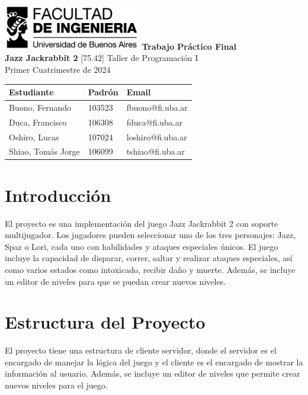 \documentclass[titlepage,a4paper]{article}
\begin{document}
\begin{titlepage} %
	\hfill\includegraphics[width=6cm]{logofiuba.jpg}
    \centering
    \vfill
    \Huge \textbf{Trabajo Práctico Final\\Jazz Jackrabbit 2}
    \vskip2cm
    \Large [75.42] Taller de Programación I\\
    Primer Cuatrimestre de 2024
    \vfill
    \begin{tabular}{ | l | l | l | } %
      \hline
      \textbf{Estudiante} & \textbf{Padrón} & \textbf{Email} \\ \hline
      Buono, Fernando & 103523 & fbuono@fi.uba.ar \\ \hline
      Duca, Francisco & 106308 & fduca@fi.uba.ar \\ \hline
      Oshiro, Lucas & 107024 & loshiro@fi.uba.ar \\ \hline
      Shiao, Tomás Jorge & 106099 & tshiao@fi.uba.ar \\ \hline
  	\end{tabular}
    \vfill
    \vfill
\end{titlepage}

\clearpage\pagestyle{empty}
\tableofcontents %
\newpage
\setcounter{page}{1}
\pagestyle{fancy}
\setcounter{secnumdepth}{5}
\setcounter{tocdepth}{5}
\section{Introducción}
El proyecto es una implementación del juego Jazz Jackrabbit 2 con soporte multijugador. Los jugadores pueden seleccionar uno de los tres personajes: Jazz, Spaz o Lori, cada uno con habilidades y ataques especiales únicos. El juego incluye la capacidad de disparar, correr, saltar y realizar ataques especiales, así como varios estados como intoxicado, recibir daño y muerte. Además, se incluye un editor de niveles para que se puedan crear nuevos niveles.

\section{Estructura del Proyecto}
El proyecto tiene una estructura de cliente servidor, donde el servidor es el encargado de manejar la lógica del juego y el cliente es el encargado de mostrar la información al usuario. Además, se incluye un editor de niveles que permite crear nuevos niveles para el juego.
\end{document}
